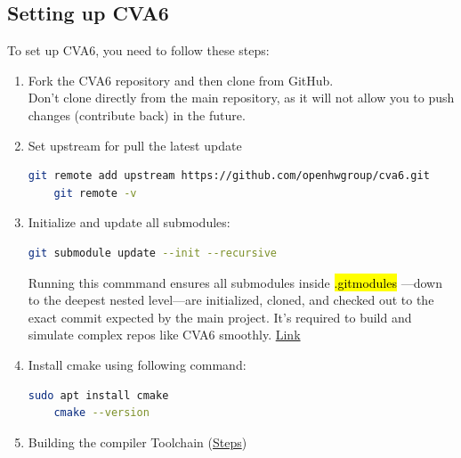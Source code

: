 \documentclass[12pt, a4paper]{article}
\begin{document}
\subsection{Setting up CVA6}

To set up CVA6, you need to follow these steps:
\begin{enumerate}
    \item Fork the CVA6 repository and then clone from GitHub. \\
    Don't clone directly from the main repository, as it will not allow you to push changes (contribute back) in the future.

    \item Set upstream for pull the latest update

    \begin{lstlisting}[language=bash, frame=single, basicstyle=\ttfamily\footnotesize, numbers = none]
    git remote add upstream https://github.com/openhwgroup/cva6.git
    git remote -v
        \end{lstlisting}



    \item Initialize and update all submodules:

        \begin{lstlisting}[language=bash, frame=single, basicstyle=\ttfamily\footnotesize, numbers = none]
    git submodule update --init --recursive
        \end{lstlisting}

        Running this commmand ensures all submodules inside \hl{.gitmodules} —down to the deepest nested level—are initialized, cloned, and checked out to the exact commit expected by the main project. It's required to build and simulate complex repos like CVA6 smoothly. \href{https://chatgpt.com/s/t_6859c638d5208191bfd8707c9580f31a}{Link}
    
    \item Install cmake using following command:

        \begin{lstlisting}[language=bash, frame=single, basicstyle=\ttfamily\footnotesize, numbers =none]
    sudo apt install cmake
    cmake --version
        \end{lstlisting}

    \item Building the compiler Toolchain (\href{https://chatgpt.com/s/t_685e68ba0bfc81918b7b5a289666f145}{Steps})
        

\end{enumerate}
\end{document}
